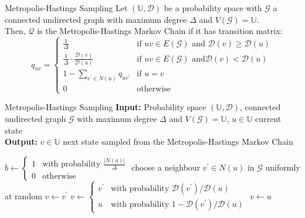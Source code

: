 \documentclass[english]{panikzettel}
\begin{document}
\begin{defi}{Metropolis-Hastings Sampling}
Let $(\mathbb{U}, \mathcal{D})$ be a probability space with $\mathcal{G}$ a connected undirected graph with maximum degree $\Delta$ and $V(\mathcal{G}) = \mathbb{U}$.\\
Then, $\mathcal{Q}$ is the Metropolis-Hastings Markov Chain if it has transition matrix:
$$
q_{uv} =
\begin{cases}
\frac{1}{\Delta} & \text{if } uv \in E(\mathcal{G}) \text{ and } \mathcal{D}(v) \geq \mathcal{D}(u) \\
\frac{1}{\Delta} \cdot \frac{\mathcal{D}(v)}{\mathcal{D}(u)} & \text{if } uv \in E(\mathcal{G}) \text{  and} \mathcal{D}(v) < \mathcal{D}(u) \\
1 - \sum_{v^\prime \in N(u)} q_{uv^\prime} & \text{if } u = v \\
0 & \text{otherwise}
\end{cases}
$$
\end{defi}

\begin{algo}{Metropolis-Hastings Sampling}
\textbf{Input:} Probability space $(\mathbb{U}, \mathcal{D})$, connected undirected graph $\mathcal{G}$ with maximum degree $\Delta$ and $V(\mathcal{G}) = \mathbb{U}$, $u\in\mathbb{U}$ current state\\
\textbf{Output:} $v \in \mathbb{U}$ next state sampled from the Metropolis-Hastings Markov Chain
\tcblower
\begin{algorithmic}[1]
  \State $b \leftarrow \begin{cases}1 & \text{with probability } \frac{|N(u)|}{\Delta} \\ 0 & \text{otherwise} \end{cases}$
    \State choose a neighbour $v^\prime \in N(u)$ in $\mathcal{G}$ uniformly at random
      \State $v \leftarrow v^\prime$
    \Else
      \State $v \leftarrow \begin{cases} v^\prime & \text{with probability } \mathcal{D}(v^\prime) / \mathcal{D}(u) \\ u & \text{with probability } 1 - \mathcal{D}(v^\prime) / \mathcal{D}(u) \end{cases}$
    \EndIf
  \Else
    \State $v \leftarrow u$
  \EndIf
\State {}
\end{algorithmic}
\end{algo}
\end{document}
